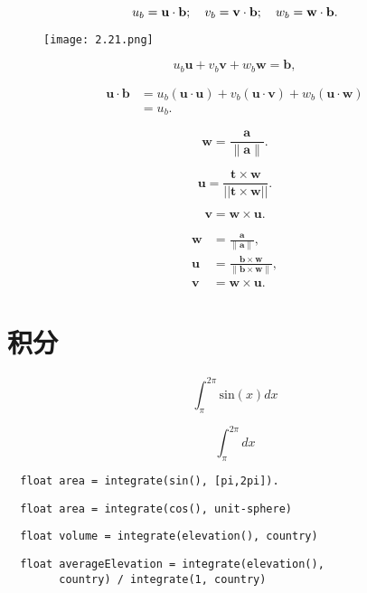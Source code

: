 \[
  u_{b}={\bf u}\cdot{\bf b};\quad v_{b}={\bf v}\cdot{\bf b};\quad w_{b}={\bf w}\cdot{\bf b}.
\]

\begin{figure}[htb]
  \centering
  \texttt{[image: 2.21.png]}
  \caption{}
\end{figure}

\[
  u_{b}\mathbf{u}+v_{b}\mathbf{v}+w_{b}\mathbf{w}=\mathbf{b},
\]

\[
  \begin{aligned}
    \mathbf{u \cdot b} & =u_{b}(\mathbf{u \cdot u})+v_{b}(\mathbf{u \cdot v})+w_{b}(\mathbf{u \cdot w}) \\
                       & =u_{b}.
  \end{aligned}
\]

\[
  \mathbf{w}={\frac{\mathbf{a}}{\|\mathbf{a}\|}}.
\]

\[
  \mathbf{u}={\frac{\mathbf{t}\times\mathbf{w}}{\left||\mathbf{t}\times\mathbf{w}|\right|}}.
\]

\[
  \mathbf{v}=\mathbf{w}\times\mathbf{u}.
\]

\[
  \begin{aligned}
    \mathbf{w} & ={\frac{\mathbf{a}}{\|\mathbf{a}\|}},                                 \\
    \mathbf{u} & ={\frac{\mathbf{b}\times\mathbf{w}}{\|\mathbf{b}\times\mathbf{w}\|}}, \\
    \mathbf{v} & =\mathbf{w}\times\mathbf{u}.
  \end{aligned}
\]

\section{积分}

\[
  \int_{\pi}^{2\pi}\mathrm{sin}(x) dx
\]

\[
  \int_{\pi}^{2\pi} dx
\]

\begin{lstlisting}
  float area = integrate(sin(), [pi,2pi]).
\end{lstlisting}

\begin{lstlisting}
  float area = integrate(cos(), unit-sphere)
\end{lstlisting}

\begin{lstlisting}
  float volume = integrate(elevation(), country)
\end{lstlisting}

\begin{lstlisting}
  float averageElevation = integrate(elevation(),
        country) / integrate(1, country)
\end{lstlisting}


